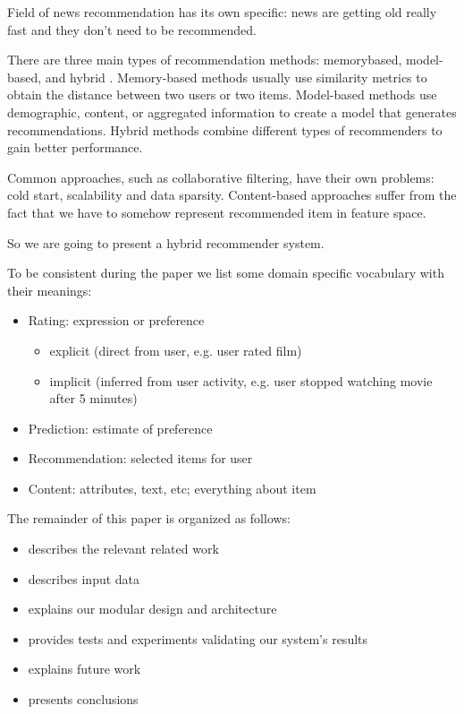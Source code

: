 \documentclass{article}
\begin{document}
    Field of news recommendation has its own specific: news are getting old really fast and they don't need to be recommended.

     There are three main types of recommendation methods: memorybased, model-based, and hybrid \citep{survey}. Memory-based methods \citep{memory} usually use similarity metrics to obtain the distance between two users or two items. Model-based methods use demographic, content, or aggregated information to create a model that generates recommendations. Hybrid \citep{combining} methods combine different types of recommenders to gain better performance.

    Common approaches, such as collaborative filtering, have their own problems: cold start, scalability and data sparsity. Content-based approaches suffer from the fact that we have to somehow represent recommended item in feature space.

    So we are going to present a hybrid recommender system.
    
    To be consistent during the paper we list some domain specific vocabulary with their meanings:

        \begin{itemize}
            \item Rating: expression or preference

                \begin{itemize}
                    \item explicit (direct from user, e.g. user rated film)
                    \item implicit (inferred from user activity, e.g. user stopped watching movie after 5 minutes)
                \end{itemize}
            \item Prediction: estimate of preference
            \item Recommendation: selected items for user
            \item Content: attributes, text, etc; everything about item
        \end{itemize}


    The remainder of this paper is organized as follows:
    
        \begin{itemize}
            \item {} describes the relevant related work
            \item {} describes input data
            \item {} explains our modular design and architecture
            \item {} provides tests and experiments validating
our system’s results
            \item {} explains future work
            \item {} presents conclusions
        \end{itemize}
\end{document}
